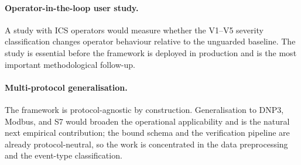 \paragraph{Operator-in-the-loop user study.}
A study with ICS operators would measure whether the V1--V5 severity
classification changes operator behaviour relative to the unguarded
baseline. The study is essential before the framework is deployed in
production and is the most important methodological follow-up.

\paragraph{Multi-protocol generalisation.}
The framework is protocol-agnostic by construction. Generalisation to
DNP3, Modbus, and S7 would broaden the operational applicability and is
the natural next empirical contribution; the bound schema and the
verification pipeline are already protocol-neutral, so the work is
concentrated in the data preprocessing and the event-type classification.
